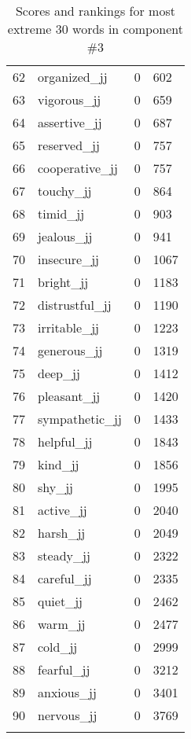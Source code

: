 \begin{longtable}[!htbp]{| rlr@{.}l |}
    62 & organized\_jj & 0 & 602 \\
    63 & vigorous\_jj & 0 & 659 \\
    64 & assertive\_jj & 0 & 687 \\
    65 & reserved\_jj & 0 & 757 \\
    66 & cooperative\_jj & 0 & 757 \\
    67 & touchy\_jj & 0 & 864 \\
    68 & timid\_jj & 0 & 903 \\
    69 & jealous\_jj & 0 & 941 \\
    70 & insecure\_jj & 0 & 1067 \\
    71 & bright\_jj & 0 & 1183 \\
    72 & distrustful\_jj & 0 & 1190 \\
    73 & irritable\_jj & 0 & 1223 \\
    74 & generous\_jj & 0 & 1319 \\
    75 & deep\_jj & 0 & 1412 \\
    76 & pleasant\_jj & 0 & 1420 \\
    77 & sympathetic\_jj & 0 & 1433 \\
    78 & helpful\_jj & 0 & 1843 \\
    79 & kind\_jj & 0 & 1856 \\
    80 & shy\_jj & 0 & 1995 \\
    81 & active\_jj & 0 & 2040 \\
    82 & harsh\_jj & 0 & 2049 \\
    83 & steady\_jj & 0 & 2322 \\
    84 & careful\_jj & 0 & 2335 \\
    85 & quiet\_jj & 0 & 2462 \\
    86 & warm\_jj & 0 & 2477 \\
    87 & cold\_jj & 0 & 2999 \\
    88 & fearful\_jj & 0 & 3212 \\
    89 & anxious\_jj & 0 & 3401 \\
    90 & nervous\_jj & 0 & 3769 \\
    \hline
    \caption{Scores and rankings for most extreme 30 words in component \#3} \\
\end{longtable}
